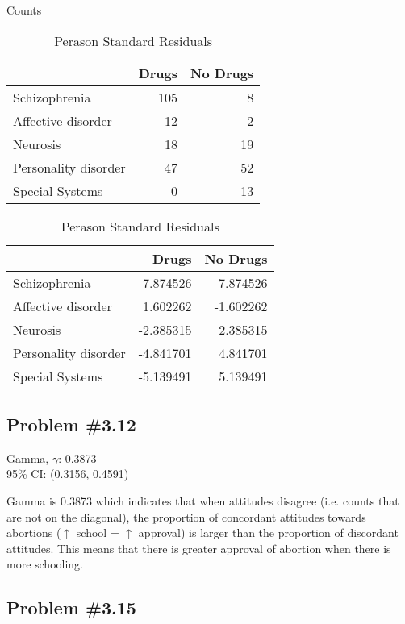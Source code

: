\documentclass[12pt, letterpaper]{article}
\begin{document}
\begin{table}[!htb]
	\begin{minipage}{.5\linewidth}
		\caption{Counts}
		\centering 
		\begin{tabular}{lrr}
			\toprule
			& Drugs & No Drugs\\
			\midrule
			Schizophrenia & 105 & 8\\
			Affective disorder & 12 & 2\\
			Neurosis & 18 & 19\\
			Personality disorder & 47 & 52\\
			Special Systems & 0 & 13\\
			\bottomrule
	\end{tabular} \end{minipage}%
	\begin{minipage}{.5\linewidth}
		\centering
		\caption{Perason Standard Residuals} 
		\begin{tabular}{lrr}
			\toprule
			& Drugs & No Drugs\\
			\midrule
			Schizophrenia & 7.874526 & -7.874526\\
			Affective disorder & 1.602262 & -1.602262\\
			Neurosis & -2.385315 & 2.385315\\
			Personality disorder & -4.841701 & 4.841701\\
			Special Systems & -5.139491 & 5.139491\\
			\bottomrule
	\end{tabular} \end{minipage} 
\end{table}


\subsection*{Problem {\#}3.12}
Gamma, $\gamma$: 0.3873 \\
95\% CI: (0.3156, 0.4591)

Gamma is 0.3873 which indicates that when attitudes disagree (i.e. counts that are not on the diagonal), the proportion of concordant attitudes towards abortions ($\uparrow$ school = $\uparrow$ approval) is larger than the proportion of discordant attitudes.  This means that there is greater approval of abortion when there is more schooling.  

\subsection*{Problem {\#}3.15}
\end{document}
